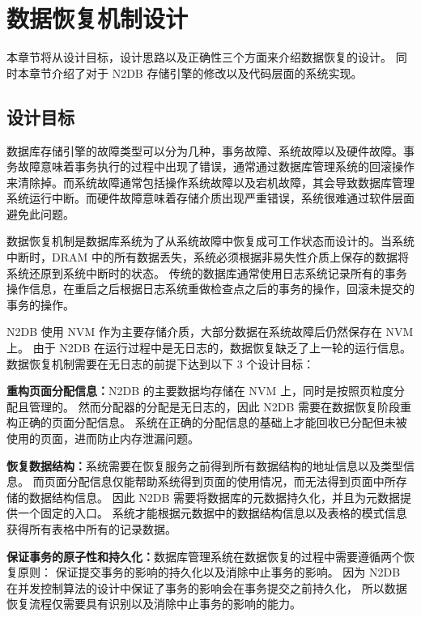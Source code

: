
\chapter{数据恢复机制设计}
\label{chap:recovery}

本章节将从设计目标，设计思路以及正确性三个方面来介绍数据恢复的设计。
同时本章节介绍了对于 N2DB 存储引擎的修改以及代码层面的系统实现。

\section{设计目标}


数据库存储引擎的故障类型可以分为几种，事务故障、系统故障以及硬件故障。事务故障意味着事务执行的过程中出现了错误，通常通过数据库管理系统的回滚操作来清除掉。而系统故障通常包括操作系统故障以及宕机故障，其会导致数据库管理系统运行中断。而硬件故障意味着存储介质出现严重错误，系统很难通过软件层面避免此问题。

数据恢复机制是数据库系统为了从系统故障中恢复成可工作状态而设计的。当系统中断时，DRAM 中的所有数据丢失，系统必须根据非易失性介质上保存的数据将系统还原到系统中断时的状态。
传统的数据库通常使用日志系统记录所有的事务操作信息，在重启之后根据日志系统重做检查点之后的事务的操作，回滚未提交的事务的操作。

N2DB 使用 NVM 作为主要存储介质，大部分数据在系统故障后仍然保存在 NVM 上。
由于 N2DB 在运行过程中是无日志的，数据恢复缺乏了上一轮的运行信息。
数据恢复机制需要在无日志的前提下达到以下 3 个设计目标：

\textbf{重构页面分配信息：}N2DB 的主要数据均存储在 NVM 上，同时是按照页粒度分配且管理的。
然而分配器的分配是无日志的，因此 N2DB 需要在数据恢复阶段重构正确的页面分配信息。
系统在正确的分配信息的基础上才能回收已分配但未被使用的页面，进而防止内存泄漏问题。

\textbf{恢复数据结构：}系统需要在恢复服务之前得到所有数据结构的地址信息以及类型信息。
而页面分配信息仅能帮助系统得到页面的使用情况，而无法得到页面中所存储的数据结构信息。
因此 N2DB 需要将数据库的元数据持久化，并且为元数据提供一个固定的入口。
系统才能根据元数据中的数据结构信息以及表格的模式信息获得所有表格中所有的记录数据。

\textbf{保证事务的原子性和持久化：}数据库管理系统在数据恢复的过程中需要遵循两个恢复原则：
保证提交事务的影响的持久化以及消除中止事务的影响。
因为 N2DB 在并发控制算法的设计中保证了事务的影响会在事务提交之前持久化，
所以数据恢复流程仅需要具有识别以及消除中止事务的影响的能力。


